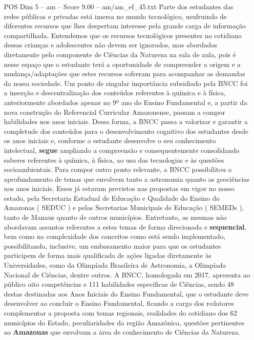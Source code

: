 \begin{textsample}{POS Dim 5 – am – Score 9.00 – am/am\_ef\_45.txt}
Parte dos estudantes das redes públicas e privadas está imersa no mundo tecnológico, usufruindo de diferentes recursos que lhes despertam interesse pela grande carga de informação compartilhada.
Entendemos que os recursos tecnológicos presentes no cotidiano dessas crianças e adolescentes não devem ser ignorados, mas abordados diretamente pelo componente de Ciências da Natureza na sala de aula, pois é nesse espaço que o estudante terá a oportunidade de compreender a origem e a mudança/adaptações que estes recursos sofreram para acompanhar as demandas da nossa sociedade.
Um ponto de singular importância subsidiado pela BNCC foi a inserção e descentralização dos conteúdos referentes à química e à física, anteriormente abordados apenas no 9º ano do Ensino Fundamental e, a partir da nova construção do Referencial Curricular Amazonense, passam a compor habilidades nos anos iniciais.
Dessa forma, a BNCC passa a valorizar e garantir a completude dos conteúdos para o desenvolvimento cognitivo dos estudantes desde os anos iniciais e, conforme o estudante desenvolve o seu conhecimento intelectual, \textbf{segue} ampliando a compreensão e consequentemente consolidando saberes referentes à química, à física, ao uso das tecnologias e às questões socioambientais.
Para compor outro ponto relevante, a BNCC possibilitou o aprofundamento de temas que envolvem tanto a astronomia quanto as geociências nos anos iniciais.
Esses já estavam previstos nas propostas em vigor no nosso estado, pela Secretaria Estadual de Educação e Qualidade do Ensino do Amazonas ( SEDUC ) e pelas Secretarias Municipais de Educação ( SEMEDs ), tanto de Manaus quanto de outros municípios.
Entretanto, as mesmas não abordavam assuntos referentes a estes temas de forma direcionada e \textbf{sequencial}, bem como na complexidade dos conceitos como está sendo implementado, possibilitando, inclusive, um embasamento maior para que os estudantes participem de forma mais qualificada de ações ligadas diretamente às Universidades, como da Olimpíada Brasileira de Astronomia, a Olimpíada Nacional de Ciências, dentre outros.
A BNCC, homologada em 2017, apresenta ao público oito competências e 111 habilidades específicas de Ciências, sendo 48 destas destinadas aos Anos Iniciais do Ensino Fundamental, que o estudante deve desenvolver ao concluir o Ensino Fundamental, ficando a cargo dos redatores complementar a proposta com temas regionais, realidades do cotidiano dos 62 municípios do Estado, peculiaridades da região Amazônica, questões pertinentes ao \textbf{Amazonas} que envolvam a área de conhecimento de Ciências da Natureza.

\end{textsample}
